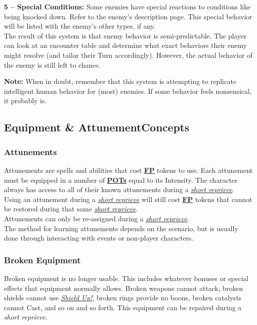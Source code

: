 \documentclass[12pt]{article}
\newcommand{\refto}[1]{\hyperlink{#1}{\textbf{#1}}}
\newcommand{\reftoit}[1]{\hyperlink{#1}{\emph{#1}}}
\begin{document}
\begin{multicols*}{2}
\textbf{5 -- Special Conditions:} Some enemies have special reactions to conditions like being knocked down. Refer to the enemy’s description page. This special behavior will be listed with the enemy’s other types, if any.\\

The result of this system is that enemy behavior is semi-predictable. The player can look at an encounter table and determine what exact behaviors their enemy might resolve (and tailor their Turn accordingly). However, the actual behavior of the enemy is still left to chance.

\begin{tcolorbox}
\textbf{Note:} When in doubt, remember that this system is attempting to replicate intelligent human behavior for (most) enemies. If some behavior feels nonsensical, it probably is.
\end{tcolorbox}

\vfill
\pagebreak

\subsection{Equipment \& Attunement\newline Concepts}

\subsubsection{Attunements}
Attunements are spells and abilities that cost \refto{FP} tokens to use. Each attunement must be equipped in a number of \refto{POTs} equal to its Intensity. The character always has access to all of their known attunements during a \reftoit{short reprieve}. Using an attunement during a \reftoit{short reprieve} will still cost \refto{FP} tokens that cannot be restored during that same \reftoit{short reprieve}.\\
Attunements can only be re-assigned during a \reftoit{short reprieve}.\\
The method for learning attunements depends on the scenario, but is usually done through interacting with events or non-player characters.

\subsubsection{Broken Equipment}
Broken equipment is no longer usable. This includes whatever bonuses or special effects that equipment normally allows. Broken weapons cannot attack, broken shields cannot use \reftoit{Shield Up!}, broken rings provide no boons, broken catalysts cannot Cast, and so on and so forth. This equipment can be repaired during a \emph{short reprieve.}


\end{multicols*}
\end{document}
